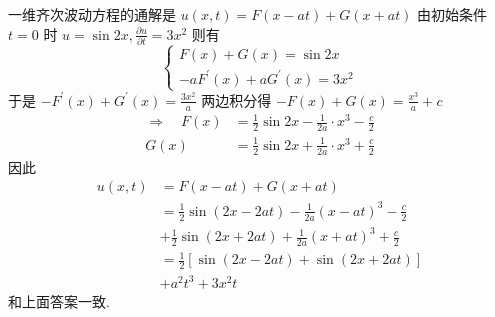 \begin{questions}
\begin{solution}
一维齐次波动方程的通解是 $ u(x, t)=F(x-a t)+G(x+a t) $
由初始条件 $ t=0 $ 时 $ u=\sin 2 x, \frac{\partial u}{\partial t}=3 x^{2} $
则有 
$$ \left\{\begin{array}{l}F(x)+G(x)=\sin 2 x \\ -a F^{\prime}(x)+a G^{\prime}(x)=3 x^{2}\end{array}\right. $$
于是 $ -F^{\prime}(x)+G^{\prime}(x)=\frac{3 x^{2}}{a} $ 两边积分得 $ -F(x)+G(x)=\frac{x^{3}}{a}+c $
$$
\begin{aligned}
\Rightarrow \quad F(x) & =\frac{1}{2} \sin 2 x-\frac{1}{2 a} \cdot x^{3}-\frac{c}{2} \\
G(x) & =\frac{1}{2} \sin 2 x+\frac{1}{2 a} \cdot x^{3}+\frac{c}{2}
\end{aligned}
$$
因此
$$
\begin{aligned}
u(x, t) & =F(x-a t)+G(x+a t) \\
& =\frac{1}{2} \sin (2 x-2 a t)-\frac{1}{2 a}(x-a t)^{3}-\frac{c}{2} \\
& +\frac{1}{2} \sin (2 x+2 a t)+\frac{1}{2 a}(x+a t)^{3}+\frac{c}{2} \\
& =\frac{1}{2}[\sin (2 x-2 a t)+\sin (2 x+2 a t)] \\
& +a^{2} t^{3}+3 x^{2} t
\end{aligned}
$$
和上面答案一致.
    \end{solution}


\end{questions}
